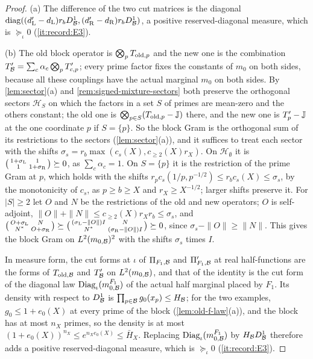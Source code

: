 \begin{proof}
(a) The difference of the two cut matrices is the diagonal
$\operatorname{diag}((d'_{\rm L}-d_{\rm L})r_bD^1_\mathcal B,(d'_{\rm R}-d_{\rm R})r_bD^1_\mathcal B)$,
a positive reserved-diagonal measure, which is $\succeq_\iota0$ (\ref{it:record:E3}).

(b) The old block operator is $\bigotimes_pT_{{\rm old},p}$ and the new one is
the combination $T'_\mathcal B=\sum_c\alpha_c\bigotimes_pT'_{c,p}$; every prime factor
fixes the constants of $m_0$ on both sides, because all these couplings have
the actual marginal $m_0$ on both sides. By \cref{lem:sector}(a) and
\cref{rem:signed-mixture-sectors} both preserve the orthogonal sectors
$\mathcal H_S$ on which the factors in a set $S$ of primes are mean-zero and the
others constant; the old one is $\bigotimes_{p\in S}(T_{{\rm old},p}-\mathbb J)$ there,
and the new one is $T'_p-\mathbb J$ at the one coordinate $p$ if $S=\{p\}$. So the
block Gram is the orthogonal sum of its restrictions to the sectors
(\cref{lem:sector}(a)), and it suffices to treat each sector with the shifts
$\sigma_s=r_b\max(c_s(X),c_{\ge2}(X)r_X)$. On $\mathcal H_\emptyset$ it is
$\bigl(\begin{smallmatrix}1+\sigma_{\rm L}&1\\1&1+\sigma_{\rm R}
\end{smallmatrix}\bigr)\succeq0$, as $\sum_c\alpha_c=1$. On $S=\{p\}$ it is the
restriction of the prime Gram at $p$, which holds with the shifts
$r_pc_s(1/p,p^{-1/2})\le r_bc_s(X)\le\sigma_s$, by the monotonicity of $c_s$, as
$p\ge b\ge X$ and $r_X\ge X^{-1/2}$; larger shifts preserve it. For $|S|\ge2$ let
$O$ and $N$ be the restrictions of the old and new operators; $O$ is
self-adjoint, $\|O\|+\|N\|\le c_{\ge2}(X)r_Xr_b\le\sigma_s$, and
$\bigl(\begin{smallmatrix}O+\sigma_{\rm L}&N\\N^*&O+\sigma_{\rm R}\end{smallmatrix}\bigr)
\succeq\bigl(\begin{smallmatrix}(\sigma_{\rm L}-\|O\|)I&N\\N^*&(\sigma_{\rm R}-\|O\|)I
\end{smallmatrix}\bigr)\succeq0$, since $\sigma_s-\|O\|\ge\|N\|$. This gives the block
Gram on $L^2(m_{0,\mathcal B})^2$ with the shifts $\sigma_s$ times $I$.

In measure form, the cut forms at $\iota$ of $\Pi_{F_1,\mathcal B}$ and
$\Pi'_{F_1,\mathcal B}$ at real half-functions are the forms of $T_{{\rm old},\mathcal B}$ and
$T'_\mathcal B$ on $L^2(m_{0,\mathcal B})$, and that of the identity is the cut form of the
diagonal law $\operatorname{Diag}_\iota(m^{F_1}_{0,\mathcal B})$ of the actual half
marginal placed by $F_1$. Its density with respect to $D^1_\mathcal B$ is
$\prod_{p\in\mathcal B}g_0(x_p)\le H_\mathcal B$; for the two examples, $g_0\le1+e_0(X)$ at
every prime of the block (\cref{lem:old-f-law}(a)), and the block has at most
$n_X$ primes, so the density is at most $(1+e_0(X))^{n_X}\le e^{n_Xe_0(X)}\le
\bar H_X$. Replacing $\operatorname{Diag}_\iota(m^{F_1}_{0,\mathcal B})$ by
$H_\mathcal B D^1_\mathcal B$ therefore adds a positive reserved-diagonal measure, which is
$\succeq_\iota0$ (\ref{it:record:E3}).


\end{proof}
